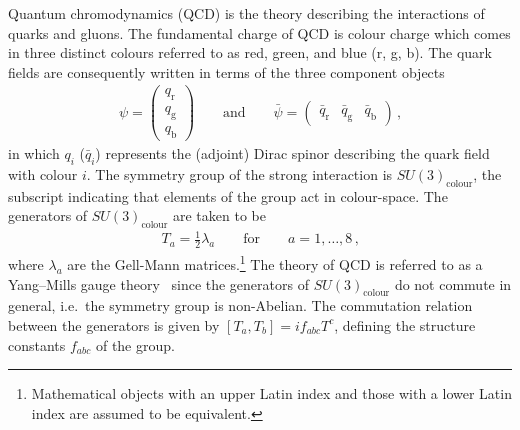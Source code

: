 Quantum chromodynamics (QCD) is the theory describing the interactions of quarks
and gluons. The fundamental charge of QCD is colour charge which comes in three
distinct colours referred to as red, green, and blue (r, g, b). The quark fields
are consequently written in terms of the three component objects
\begin{align*}
  \psi =
  \begin{pmatrix}
    q_\text{r} \\
    q_\text{g} \\
    q_\text{b}
  \end{pmatrix}
  \qquad
  \text{and}
  \qquad
  \bar{\psi} =
  \begin{pmatrix}
    \bar{q}_\text{r} & \bar{q}_\text{g} & \bar{q}_\text{b}
  \end{pmatrix} \,\text{,}
\end{align*}
in which $q_i$ ($\bar{q}_i$) represents the (adjoint) Dirac spinor describing
the quark field with colour $i$. The symmetry group of the strong interaction is
$SU(3)_{\text{colour}}$, the subscript indicating that elements of the group act
in colour-space. The generators of $SU(3)_{\text{colour}}$ are taken to be
\begin{align*}
  T_a = \frac{1}{2} \lambda_a \qquad \text{for} \qquad a = 1, \dots, 8 \,\text{,}
\end{align*}
where $\lambda_a$ are the Gell-Mann matrices.\footnote{Mathematical objects with
  an upper Latin index and those with a lower Latin index are assumed to be
  equivalent.} The theory of QCD is referred to as a Yang--Mills gauge
theory~\cite{Yang:1954ek} since the generators of $SU(3)_{\text{colour}}$ do not
commute in general, i.e.\ the symmetry group is non-Abelian. The commutation
relation between the generators is given by $[T_a, T_b] = i f_{abc} T^c$,
defining the structure constants $f_{abc}$ of the group.

